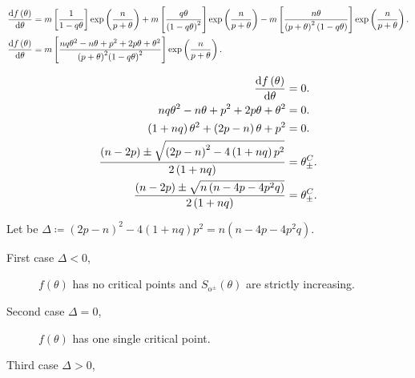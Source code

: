 \documentclass[
    8pt,
    aspectratio=1610,
    c,
    intlimits,
    leqno,
    professionalfonts,
]{beamer}
\begin{document}
\begin{frame}
	\begin{align*}
		\diff{f\left(\theta\right)}{\theta} & =
		m\left[\frac{1}{1-q\theta}\right]
		\exp\left(\frac{n}{p+\theta}\right)+
		m\left[\frac{q\theta}{\left(1-q\theta\right)^{2}}\right]
		\exp\left(\frac{n}{p+\theta}\right)-
		m\left[\frac{n\theta}{{\left(p+\theta\right)}^{2}\left(1-q\theta\right)}\right]
		\exp\left(\frac{n}{p+\theta}\right).    \\
		\diff{f\left(\theta\right)}{\theta} & =
		m\left[
			\frac{
				nq\theta^{2}-
				n\theta+
				p^{2}+
				2p\theta+
				\theta^{2}
			}{
				{\left(p+\theta\right)}^{2}
					{\left(1-q\theta\right)}^{2}
			}
			\right]
		\exp\left(\frac{n}{p+\theta}\right).
	\end{align*}

	\begin{align*}
		\diff{f\left(\theta\right)}{\theta} & =
		0.                                      \\
		nq\theta^{2}-
		n\theta+
		p^{2}+
		2p\theta+
		\theta^{2}                          & =
		0.                                      \\
		\left(1+nq\right)
		\theta^{2}+
		\left(2p-n\right)\theta+
		p^{2}                               & =
		0.                                      \\
		\frac{
		\left(n-2p\right)\pm
		\sqrt{{\left(2p-n\right)}^{2}-4\left(1+nq\right)p^{2}}
		}{
		2\left(1+nq\right)
		}
		                                    & =
		\theta^{C}_{\pm}.                       \\
		\frac{
			\left(n-2p\right)\pm
			\sqrt{n\left(n-4p-4p^{2}q\right)}
		}{
			2\left(1+nq\right)
		}
		                                    & =
		\theta^{C}_{\pm}.
	\end{align*}

	Let be $\Delta\coloneqq {\left(2p-n\right)}^{2}-4\left(1+nq\right)p^{2}=n\left(n-4p-4p^{2}q\right)$.

	\begin{description}
		\item[First case $\Delta<0$,]

		      $f\left(\theta\right)$ has no critical points and $S_{\text{o}^{\pm}}\left(\theta\right)$ are strictly increasing.

		\item[Second case $\Delta=0$,]

		      $f\left(\theta\right)$ has one single critical point.

		\item[Third case $\Delta>0$,]


\end{description}
\end{frame}
\end{document}
